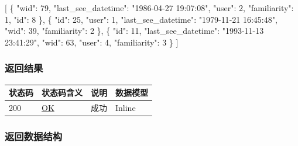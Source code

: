 \documentclass[
]{article}
\newenvironment{Shaded}{}{}
\newcommand{\DataTypeTok}[1]{\textcolor[rgb]{0.56,0.13,0.00}{#1}}
\newcommand{\DecValTok}[1]{\textcolor[rgb]{0.25,0.63,0.44}{#1}}
\newcommand{\FunctionTok}[1]{\textcolor[rgb]{0.02,0.16,0.49}{#1}}
\newcommand{\OtherTok}[1]{\textcolor[rgb]{0.00,0.44,0.13}{#1}}
\newcommand{\StringTok}[1]{\textcolor[rgb]{0.25,0.44,0.63}{#1}}
\begin{document}
\begin{Shaded}
\begin{Highlighting}[]
\OtherTok{[}
  \FunctionTok{\{}
    \DataTypeTok{"wid"}\FunctionTok{:} \DecValTok{79}\FunctionTok{,}
    \DataTypeTok{"last\_see\_datetime"}\FunctionTok{:} \StringTok{"1986{-}04{-}27 19:07:08"}\FunctionTok{,}
    \DataTypeTok{"user"}\FunctionTok{:} \DecValTok{2}\FunctionTok{,}
    \DataTypeTok{"familiarity"}\FunctionTok{:} \DecValTok{1}\FunctionTok{,}
    \DataTypeTok{"id"}\FunctionTok{:} \DecValTok{8}
  \FunctionTok{\}}\OtherTok{,}
  \FunctionTok{\{}
    \DataTypeTok{"id"}\FunctionTok{:} \DecValTok{25}\FunctionTok{,}
    \DataTypeTok{"user"}\FunctionTok{:} \DecValTok{1}\FunctionTok{,}
    \DataTypeTok{"last\_see\_datetime"}\FunctionTok{:} \StringTok{"1979{-}11{-}21 16:45:48"}\FunctionTok{,}
    \DataTypeTok{"wid"}\FunctionTok{:} \DecValTok{39}\FunctionTok{,}
    \DataTypeTok{"familiarity"}\FunctionTok{:} \DecValTok{2}
  \FunctionTok{\}}\OtherTok{,}
  \FunctionTok{\{}
    \DataTypeTok{"id"}\FunctionTok{:} \DecValTok{11}\FunctionTok{,}
    \DataTypeTok{"last\_see\_datetime"}\FunctionTok{:} \StringTok{"1993{-}11{-}13 23:41:29"}\FunctionTok{,}
    \DataTypeTok{"wid"}\FunctionTok{:} \DecValTok{63}\FunctionTok{,}
    \DataTypeTok{"user"}\FunctionTok{:} \DecValTok{4}\FunctionTok{,}
    \DataTypeTok{"familiarity"}\FunctionTok{:} \DecValTok{3}
  \FunctionTok{\}}
\OtherTok{]}
\end{Highlighting}
\end{Shaded}

\hypertarget{ux8fd4ux56deux7ed3ux679c-16}{%
\subsubsection{返回结果}\label{ux8fd4ux56deux7ed3ux679c-16}}

\begin{longtable}[]{@{}llll@{}}
\toprule
状态码 & 状态码含义 & 说明 & 数据模型 \\
\midrule
\endhead
200 & \href{https://tools.ietf.org/html/rfc7231\#section-6.3.1}{OK} &
成功 & Inline \\
\bottomrule
\end{longtable}

\hypertarget{ux8fd4ux56deux6570ux636eux7ed3ux6784-12}{%
\subsubsection{返回数据结构}\label{ux8fd4ux56deux6570ux636eux7ed3ux6784-12}}
\end{document}
